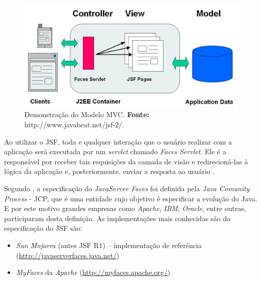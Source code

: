 \begin{figure}[h!]
	\centerline{\includegraphics[scale=0.5]{./imagens/jsf_using_mvc.jpg}}
	\caption[Demonstração do Modelo MVC]
	{Demonstração do Modelo MVC. \textbf{Fonte:}
	http://www.javabeat.net/jsf-2/.}
	\label{fig:modelo_mvc}
\end{figure}

\par Ao utilizar o JSF, toda e qualquer interação que o usuário realizar com a aplicação será executada por 
um \textit{servlet} chamado \textit{Faces Servlet}. Ele é a responsável por
receber tais requisições da camada de visão e redirecioná-las à lógica da aplicação e, posteriormente, enviar a resposta ao 
usuário \cite{faria_java_ee_7_jsf_primefaces_cdi}.

\par Segundo , a especificação do \textit{JavaServer
	Faces} foi definida pela \textit{Java Comunity Process} - JCP\footnotemark[4],
	que é uma entidade cujo objetivo é especificar a evolução do Java. E por este motivo grandes empresas como
\textit{Apache}, \textit{IBM}, \textit{Oracle}, entre outras, participaram
desta definição. As implementações mais conhecidas são da especificação do JSF são:


\begin{itemize}
	\item \textit{Sun Mojarra} (antes JSF R1) – implementação de referência
	(\url{http://javaserverfaces.java.net/})
	
	\item \textit{MyFaces} da \textit{Apache} (\url{http://myfaces.apache.org/})
\end{itemize}

